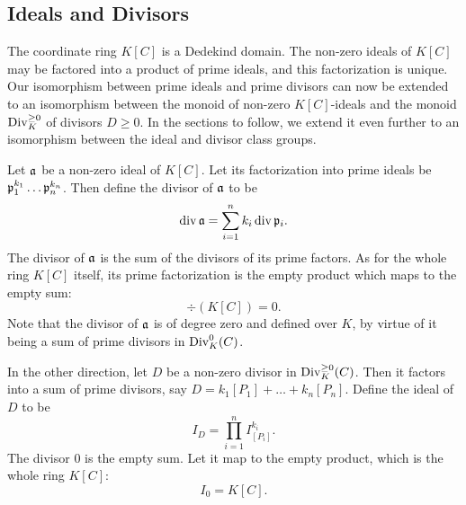 \subsection{Ideals and Divisors}

The coordinate ring $K[C]$ is a Dedekind domain.
The non-zero ideals of $K[C]$ may be factored into a product of prime ideals, and this factorization is unique.
Our isomorphism between prime ideals and prime divisors can now be extended
to an isomorphism between the monoid of non-zero $K[C]$-ideals
and the monoid $\Div_K^{\geq 0}$ of divisors $D \geq 0$.
In the sections to follow, we extend it even further
to an isomorphism between the ideal and divisor class groups.

Let $\frak a$ be a non-zero ideal of $K[C]$.
Let its factorization into prime ideals be $\frak p_1^{k_1} \dots \frak p_n^{k_n}$.
Then define the divisor of $\frak a$ to be
\[ \div \frak a = \sum_{i=1}^n k_i \div \frak p_i. \]
The divisor of $\frak a$ is the sum of the divisors of its prime factors.
As for the whole ring $K[C]$ itself,
its prime factorization is the empty product which maps to the empty sum:
  \[ \div (K[C]) = 0. \]
Note that the divisor of $\frak a$ is of degree zero and defined over $K$,
by virtue of it being a sum of prime divisors in $\Div_K^0(C)$.

In the other direction, let $D$ be a non-zero divisor in $\Div_K^{\geq 0}(C)$.
Then it factors into a sum of prime divisors, say $D = k_1[P_1] + \dots + k_n[P_n]$.
Define the ideal of $D$ to be
\[ I_D = \prod_{i=1}^n I_{[P_i]}^{k_i}. \]
The divisor 0 is the empty sum.
Let it map to the empty product, which is the whole ring $K[C]$:
\[ I_{0} = K[C]. \]

